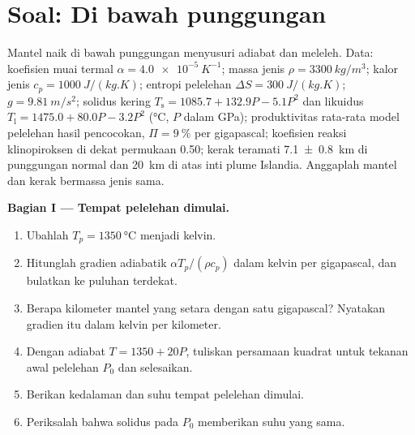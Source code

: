 \section{Soal: Di bawah punggungan}

\begin{problem}
\label{pb:b2:mantle-melting:1}
Mantel naik di bawah punggungan menyusuri adiabat dan meleleh. Data: koefisien
muai termal $\alpha = \qty{4.0e-5}{K^{-1}}$; massa jenis $\rho = \qty{3300}{kg/m^3}$;
kalor jenis $c_p = \qty{1000}{J/(kg.K)}$; entropi pelelehan $\Delta S =
\qty{300}{J/(kg.K)}$; $g = \qty{9.81}{m/s^2}$; solidus kering $T_{\mathrm s} =
1085.7 + 132.9P - 5.1P^2$ dan likuidus  $T_{\mathrm l} = 1475.0 +
80.0P - 3.2P^2$ (\unit{\celsius}, $P$ dalam \unit{GPa}); produktivitas rata-rata model
pelelehan hasil pencocokan, $\Pi = \qty{9}{\percent}$ per gigapascal; koefisien reaksi
klinopiroksen di dekat permukaan 0.50; kerak teramati \qty[uncertainty-mode=separate]{7.1 \pm 0.8}{km}
di punggungan normal dan \qty{20}{km} di atas inti plume Islandia. Anggaplah mantel
dan kerak bermassa jenis sama.

\noindent\textbf{Bagian I --- Tempat pelelehan dimulai.}
\begin{enumerate}
\item Ubahlah $T_p = \qty{1350}{\celsius}$ menjadi kelvin.
\item Hitunglah gradien adiabatik $\alpha T_p/(\rho c_p)$ dalam kelvin per
gigapascal, dan bulatkan ke puluhan terdekat.
\item Berapa kilometer mantel yang setara dengan satu gigapascal? Nyatakan gradien itu dalam
kelvin per kilometer.
\item Dengan adiabat $T = 1350 + 20P$, tuliskan persamaan kuadrat untuk tekanan awal pelelehan
$P_0$ dan selesaikan.
\item Berikan kedalaman dan suhu tempat pelelehan dimulai.
\item Periksalah bahwa solidus pada $P_0$ memberikan suhu yang sama.
\end{enumerate}


\end{problem}
